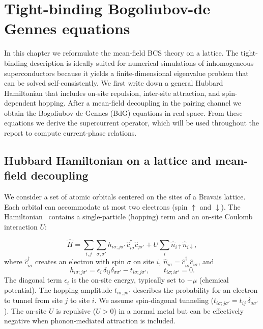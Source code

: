 \documentclass[11pt,a4paper,twoside,openany]{report}
\begin{document}
    
\chapter{Tight-binding Bogoliubov-de Gennes equations}

In this chapter we reformulate the mean-field BCS theory on a lattice.  The tight-binding description is ideally suited for numerical simulations of inhomogeneous superconductors because it yields a finite-dimensional eigenvalue problem that can be solved self-consistently.  We first write down a general Hubbard Hamiltonian that includes on-site repulsion, inter-site attraction, and spin-dependent hopping.  After a mean-field decoupling in the pairing channel we obtain the Bogoliubov-de Gennes (BdG) equations in real space.  From these equations we derive the supercurrent operator, which will be used throughout the report to compute current-phase relations.

\section{Hubbard Hamiltonian on a lattice and mean-field decoupling}

We consider a set of atomic orbitals centered on the sites of a Bravais lattice.  Each orbital can accommodate at most two electrons (spin $\uparrow$ and $\downarrow$).  The Hamiltonian~\cite{zhu_bogoliubov-gennes_2016,micnas_superconductivity_1990} contains a single-particle (hopping) term and an on-site Coulomb interaction $U$:

\begin{equation}
  \hat{H} = \sum_{i,j}\sum_{\sigma,\sigma'} h_{i\sigma;j\sigma'} \, \hat{c}_{i\sigma}^\dagger \hat{c}_{j\sigma'}  + U \sum_i \hat{n}_{i\uparrow} \hat{n}_{i\downarrow},
    \label{eq:Hubbard}
\end{equation}
where $\hat{c}_{i\sigma}^\dagger$ creates an electron with spin $\sigma$ on site $i$, $\hat{n}_{i\sigma}=\hat{c}_{i\sigma}^\dagger\hat{c}_{i\sigma}$, and
\begin{equation}
  h_{i\sigma;j\sigma'} = \epsilon_i\,\delta_{ij}\delta_{\sigma\sigma'} - t_{i\sigma;j\sigma'} ,
  \qquad t_{i\sigma;i\sigma'}=0 .
\end{equation}
The diagonal term $\epsilon_i$ is the on-site energy, typically set to $-\mu$ (chemical potential).  The hopping amplitude $t_{i\sigma;j\sigma'}$ describes the probability for an electron to tunnel from site $j$ to site $i$. We assume spin-diagonal tunneling ($t_{i\sigma;j\sigma'}=t_{ij}\,\delta_{\sigma\sigma'}$).  The on-site $U$ is repulsive ($U>0$) in a normal metal but can be effectively negative when phonon-mediated attraction is included.
\end{document}

